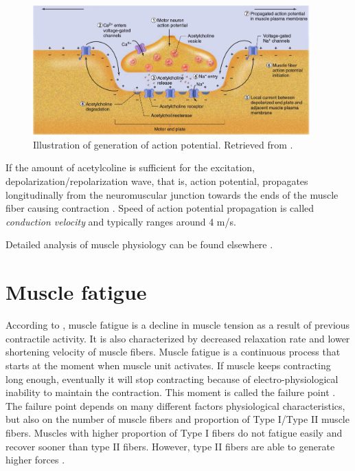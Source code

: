 \begin{figure}[ht]
\centering
\includegraphics[width=0.95\textwidth]{Images/introduction/action_potential_generation.png}
\caption{Illustration of generation of action potential. Retrieved from \citep{Widmaier2014}.}
\label{fig:action_potential_generation}
\end{figure}
  
If the amount of acetylcoline is sufficient for the excitation, depolarization/repolarization wave, that is, action potential, propagates longitudinally from the neuromuscular junction towards the ends of the muscle fiber causing contraction \citep{Henneberg1999}. Speed of action potential propagation is called \emph{conduction velocity} and typically ranges around 4 m/s.

Detailed analysis of muscle physiology can be found elsewhere \citep{Squire1986, Widmaier2014}.



\section{Muscle fatigue}

According to \citet{Widmaier2014}, muscle fatigue is a decline in muscle tension as a result of previous contractile activity. It is also characterized by decreased relaxation rate and lower shortening velocity of muscle fibers. Muscle fatigue is a continuous process that starts at the moment when muscle unit activates. If muscle keeps contracting long enough, eventually it will stop contracting because of electro-physiological inability to maintain the contraction. This moment is called the failure point \citep{DeLuca1984}. The failure point depends on many different factors physiological characteristics, but also on the number of muscle fibers and proportion of Type I/Type II muscle fibers. Muscles with higher proportion of Type I fibers do not fatigue easily and recover sooner than type II fibers. However, type II fibers are able to generate higher forces \citep{Kupa1995}.

